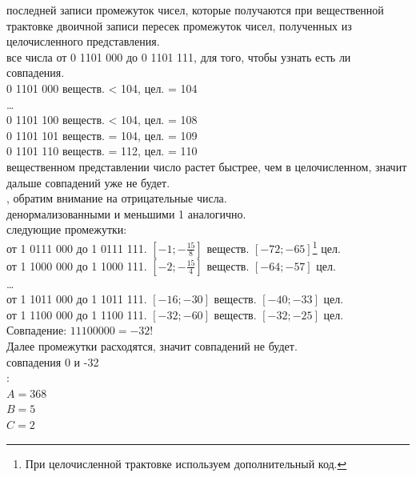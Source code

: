 \documentclass[12pt, letterpaper]{article}
\begin{document}
 последней записи промежуток чисел, которые получаются при вещественной трактовке двоичной записи пересек промежуток чисел, полученных из целочисленного представления.\\

 все числа от 0 1101 000 до 0 1101 111, для того, чтобы узнать есть ли совпадения.\\
0 1101 000 веществ. < 104, цел. = 104\\
\dots\\
0 1101 100 веществ. < 104, цел. = 108\\
0 1101 101 веществ. = 104, цел. = 109\\
0 1101 110 веществ. = 112, цел. = 110\\
 вещественном представлении число растет быстрее, чем в целочисленном, значит дальше совпадений уже не будет.\\

, обратим внимание на отрицательные числа.\\

 денормализованными и меньшими 1 аналогично.\\

 следующие промежутки:\\
от 1 0111 000 до 1 0111 111. $[-1;-\frac{15}{8}]$ веществ. $[-72;-65]$\footnote{При целочисленной трактовке используем дополнительный код.} цел.\\
от 1 1000 000 до 1 1000 111. $[-2;-\frac{15}{4}]$ веществ. $[-64;-57]$ цел.\\
\dots\\
от 1 1011 000 до 1 1011 111. $[-16;-30]$ веществ. $[-40;-33]$ цел.\\
от 1 1100 000 до 1 1100 111. $[-32;-60]$ веществ. $[-32;-25]$ цел.\\
Совпадение: $1 1100 000 = -32$!\\
Далее промежутки расходятся, значит совпадений не будет.\\

 совпадения 0 и -32\\

\setlength{\leftskip}{0cm}
:\\
$A = 368$\\
$B = 5$\\
$C = 2$
\newpage
\end{document}
